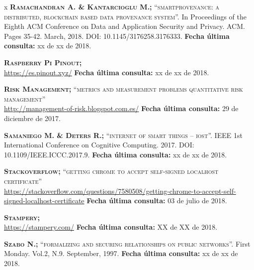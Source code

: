 \begin{thebibliography} {x}
	 \textsc{\textbf{Ramachandran A. \& Kantarcioglu M.; }} \textsc{“smartprovenance: a distributed, blockchain based data provenance system”.} In Proceedings of the Eighth ACM Conference on Data and Application Security and Privacy. ACM. Pages 35-42. March, 2018. DOI: 10.1145/3176258.3176333.
	\newline \textbf{Fecha última consulta:} xx de xx de 2018.
	
	 \textsc{\textbf{Raspberry Pi Pinout; }} \\ 
	\url{https://es.pinout.xyz/}
	\newline \textbf{Fecha última consulta:} xx de xx de 2018.
	
	 \textsc{\textbf{Risk Management; }}\textsc{“metrics and measurement problems quantitative risk management”} \\
	\url{http://management-of-risk.blogspot.com.es/}
	\newline \textbf{Fecha última consulta:} 29 de diciembre de 2017.
				

	 \textsc{\textbf{Samaniego M. \& Deters R.; }} \textsc{“internet of smart things – iost”.} IEEE 1st International Conference on Cognitive Computing. 2017. DOI: 10.1109/IEEE.ICCC.2017.9.	
	\newline \textbf{Fecha última consulta:} xx de xx de 2018.
	
	 \textsc{\textbf{Stackoverflow; }}\textsc{“getting chrome to accept self-signed localhost certificate”} \\ 
	\url{https://stackoverflow.com/questions/7580508/getting-chrome-to-accept-self-signed-localhost-certificate}
	\newline \textbf{Fecha última consulta:} 03 de julio de 2018.
		
	 \textsc{\textbf{Stampery; }} \\
	\url{https://stampery.com/}
	\newline \textbf{Fecha última consulta:} XX de XX de 2018.
				
	 \textsc{\textbf{Szabo N.; }} \textsc{“formalizing and securing relationships on public networks”.} First Monday. Vol.2, N.9. September, 1997.	
	\newline \textbf{Fecha última consulta:} xx de xx de 2018.
		

\end{thebibliography}
